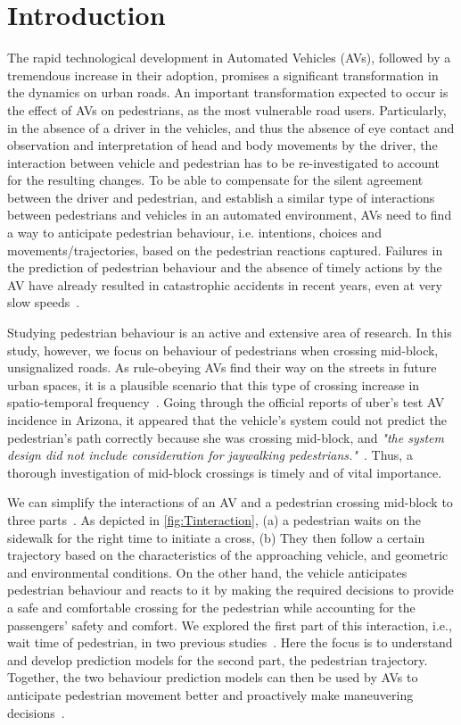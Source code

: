 \section{Introduction}
\label{S:TInt}

The rapid technological development in Automated Vehicles (AVs), followed by a tremendous increase in their adoption, promises a significant transformation in the dynamics on urban roads. An important transformation expected to occur is the effect of AVs on pedestrians, as the most vulnerable road users. Particularly, in the absence of a driver in the vehicles, and thus the absence of eye contact and observation and interpretation of head and body movements by the driver, the interaction between vehicle and pedestrian has to be re-investigated to account for the resulting changes. To be able to compensate for the silent agreement between the driver and pedestrian, and establish a similar type of interactions between pedestrians and vehicles in an automated environment, AVs need to find a way to anticipate pedestrian behaviour, i.e. intentions, choices and movements/trajectories, based on the pedestrian reactions captured. Failures in the prediction of pedestrian behaviour and the absence of timely actions by the AV have already resulted in catastrophic accidents in recent years, even at very slow speeds~\citep{uber,vienna}.

Studying pedestrian behaviour is an active and extensive area of research. In this study, however, we focus on behaviour of pedestrians when crossing mid-block, unsignalized roads. As rule-obeying AVs find their way on the streets in future urban spaces, it is a plausible scenario that this type of crossing increase in spatio-temporal frequency~\citep{millard2018pedestrians}. Going through the official reports of uber's test AV incidence in Arizona, it appeared that the vehicle's system could not predict the pedestrian's path correctly because she was crossing mid-block, and \textit{"the system design did not include consideration for jaywalking pedestrians."}~\citep{uber,ntsb}. Thus, a thorough investigation of mid-block crossings is timely and of vital importance. 

We can simplify the interactions of an AV and a pedestrian crossing mid-block to three parts~\cite{kalatian2020decoding}. As depicted in \cref{fig:Tinteraction}, (a) a pedestrian waits on the sidewalk for the right time to initiate a cross, (b) They then follow a certain trajectory based on the characteristics of the approaching vehicle, and geometric and environmental conditions. On the other hand, the vehicle anticipates pedestrian behaviour and reacts to it by making the required decisions to provide a safe and comfortable crossing for the pedestrian while accounting for the passengers' safety and comfort. We explored the first part of this interaction, i.e., wait time of pedestrian, in two previous studies~\cite{kalatian2019deepwait,kalatian2020decoding}. Here the focus is to understand and develop prediction models for the second part, the pedestrian trajectory. Together, the two behaviour prediction models can then be used by AVs to anticipate pedestrian movement better and proactively make maneuvering decisions~\cite{vasquez2019multi}.

